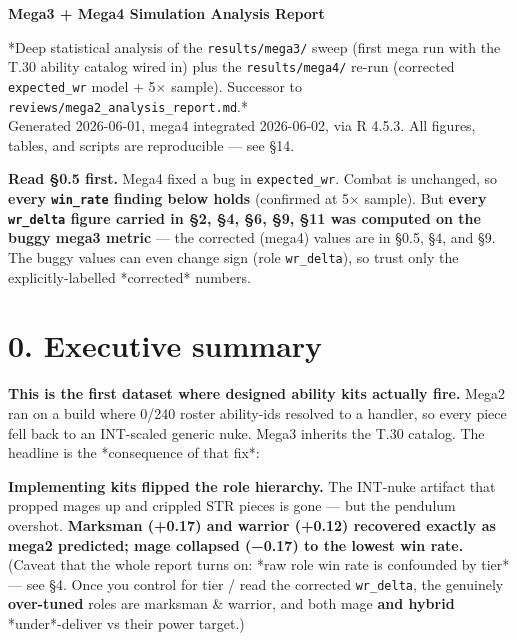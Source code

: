 \documentclass[10pt]{article}
\begin{document}
\begin{center}{\LARGE\bfseries Mega3 + Mega4 Simulation Analysis Report}\end{center}\vspace{6pt}

*Deep statistical analysis of the \texttt{results/\allowbreak{}mega3/\allowbreak{}} sweep (first mega run with the T.30 ability catalog wired in) plus the \texttt{results/\allowbreak{}mega4/\allowbreak{}} re-run (corrected \texttt{expected\_\allowbreak{}wr} model + 5$\times$ sample). Successor to \texttt{reviews/\allowbreak{}mega2\_\allowbreak{}analysis\_\allowbreak{}report.\allowbreak{}md}.*\\

Generated 2026-06-01, mega4 integrated 2026-06-02, via R 4.5.3. All figures, tables, and scripts are reproducible --- see \S{}14.\\

\begin{quotebox}
\textbf{Read \S{}0.5 first.} Mega4 fixed a bug in \texttt{expected\_\allowbreak{}wr}. Combat is unchanged, so \textbf{every \texttt{win\_\allowbreak{}rate} finding below holds} (confirmed at 5$\times$ sample). But \textbf{every \texttt{wr\_\allowbreak{}delta} figure carried in \S{}2, \S{}4, \S{}6, \S{}9, \S{}11 was computed on the buggy mega3 metric} --- the corrected (mega4) values are in \S{}0.5, \S{}4, and \S{}9. The buggy values can even change sign (role \texttt{wr\_\allowbreak{}delta}), so trust only the explicitly-labelled *corrected* numbers.
\end{quotebox}


\section*{0. Executive summary}

\textbf{This is the first dataset where designed ability kits actually fire.} Mega2 ran on a build where 0/240 roster ability-ids resolved to a handler, so every piece fell back to an INT-scaled generic nuke. Mega3 inherits the T.30 catalog. The headline is the *consequence of that fix*:\\

\begin{quotebox}
\textbf{Implementing kits flipped the role hierarchy.} The INT-nuke artifact that propped mages up and crippled STR pieces is gone --- but the pendulum overshot. \textbf{Marksman (+0.17) and warrior (+0.12) recovered exactly as mega2 predicted; mage collapsed (−0.17) to the lowest win rate.} (Caveat that the whole report turns on: *raw role win rate is confounded by tier* --- see \S{}4. Once you control for tier / read the corrected \texttt{wr\_\allowbreak{}delta}, the genuinely \textbf{over-tuned} roles are marksman \& warrior, and both mage \textbf{and hybrid} *under*-deliver vs their power target.)
\end{quotebox}
\end{document}
